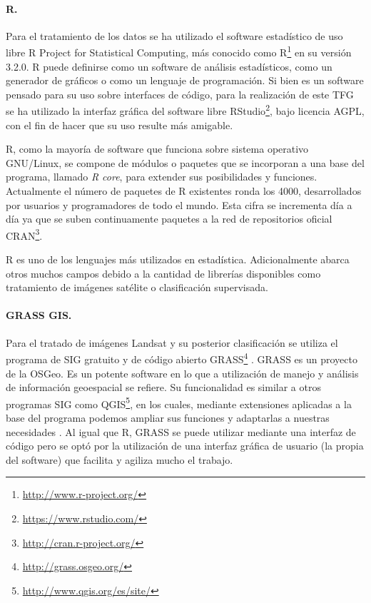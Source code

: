 \paragraph{R.}
Para el tratamiento de los datos se ha utilizado el software estadístico de uso libre R Project for Statistical Computing, más conocido como R\footnote{\url{http://www.r-project.org/}} \citep{R2013} en su versión 3.2.0. R puede definirse como un software de análisis estadísticos, como un generador de gráficos o como un lenguaje de programación. Si bien es un software pensado para su uso sobre interfaces de código, para la realización de este \ac{TFG} se ha utilizado la interfaz gráfica del software libre RStudio\footnote{\url{https://www.rstudio.com/}}, bajo licencia AGPL, con el fin de hacer que su uso resulte más amigable.%

R, como la mayoría de software que funciona sobre sistema operativo GNU/Linux, se compone de módulos o paquetes que se incorporan a una base del programa, llamado \textit{R core}, para extender sus posibilidades y funciones. Actualmente el número de paquetes de R existentes ronda los 4000, desarrollados por usuarios y programadores de todo el mundo. Esta cifra se incrementa día a día ya que se suben continuamente paquetes a la red de repositorios oficial \ac{CRAN}\footnote{\url{http://cran.r-project.org/}}.%

R es uno de los lenguajes más utilizados en estadística. Adicionalmente abarca otros muchos campos debido a la cantidad de librerías disponibles como tratamiento de imágenes satélite o clasificación supervisada.

\paragraph{GRASS GIS.}
Para el tratado de imágenes Landsat y su posterior clasificación se utiliza el programa de \ac{SIG} gratuito y de código abierto \ac{GRASS}\footnote{\url{http://grass.osgeo.org/}} \citep{GRASS_GIS_software}. GRASS es un proyecto de la \ac{OSGeo}. Es un potente software en lo que a utilización de manejo y análisis de información geoespacial se refiere. Su funcionalidad es similar a otros programas \ac{SIG} como QGIS\footnote{\url{http://www.qgis.org/es/site/}}, en los cuales, mediante extensiones aplicadas a la base del programa podemos ampliar sus funciones y adaptarlas a nuestras necesidades \citep{neteler2002open}. Al igual que R, \ac{GRASS} se puede utilizar mediante una interfaz de código pero se optó por la utilización de una interfaz gráfica de usuario (la propia del software) que facilita y agiliza mucho el trabajo.%

